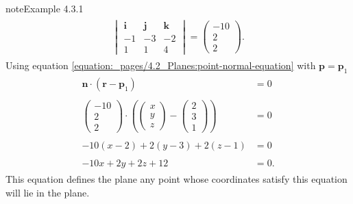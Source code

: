 \documentclass[letterpaper,10pt,english]{jupyterBook}
\begin{document}
\begin{sphinxadmonition}{note}{Example 4.3.1}
\begin{equation*}
\begin{split}
\begin{align*}
\begin{vmatrix}
        \mathbf{i} & \mathbf{j} & \mathbf{k} \\
        -1 & -3 & -2 \\
        1 & 1 & 4
    \end{vmatrix} =
    \begin{pmatrix} -10 \\ 2 \\ 2 \end{pmatrix}.
\end{align*} \end{split}
\end{equation*}
\sphinxAtStartPar
Using equation \eqref{equation:_pages/4.2_Planes:point-normal-equation} with \(\mathbf{p} = \mathbf{p}_1\)
\begin{equation*}
\begin{split} \begin{align*}
    \mathbf{n} \cdot (\mathbf{r} - \mathbf{p}_1) &= 0 \\ \\
    \begin{pmatrix} -10 \\ 2 \\ 2 \end{pmatrix} \cdot \left(
        \begin{pmatrix} x \\ y \\ z \end{pmatrix} -
        \begin{pmatrix} 2 \\ 3 \\ 1 \end{pmatrix}
    \right) &= 0 \\ \\
    -10(x - 2) + 2(y - 3) + 2(z - 1) &= 0 \\ \\
    -10x + 2y + 2z + 12 &= 0.
\end{align*} \end{split}
\end{equation*}
\sphinxAtStartPar
This equation defines the plane \sphinxhyphen{} any point whose coordinates satisfy this equation will lie in the plane.


\end{sphinxadmonition}
\end{document}

